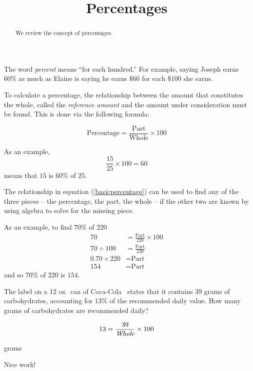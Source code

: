 \documentclass{ximera}
\title{Percentages}
\begin{document}
\begin{abstract}
We review the concept of percentages.
\end{abstract}
\maketitle


The word \emph{percent} means ``for each hundred.'' For example, saying Joseph earns $60\%$ as much as Elaine is saying he earns $\$60$ for each $\$100$ she earns.

To calculate a percentage, the relationship between the amount that constitutes the whole, called the \emph{reference amount} and the amount under consideration must be found. This is done via the following formula:

\begin{equation}\label{basicpercentage}
\text{Percentage}=\frac{\text{Part}}{\text{Whole}}\times 100
\end{equation}

As an example,
\begin{equation*}
\frac{15}{25}\times 100=60
\end{equation*}
means that $15$ is $60\%$ of $25$.

The relationship in equation (\ref{basicpercentage}) can be used to find any of the three pieces -- the percentage, the part, the whole -- if the other two are known by using algebra to solve for the missing piece.

As an example, to find $70\%$ of $220$
\begin{align*}
70&=\frac{\text{Part}}{220}\times 100\\
70\div 100 &=\frac{\text{Part}}{220}\\
0.70\times 220 &=\text{Part}\\
154&=\text{Part}
\end{align*}
and so $70\%$ of $220$ is $154$.

\newcommand\customfont[1]{{ #1 }}

\begin{question}
The label on a 12 oz.\ can of \customfont{Coca-Cola}\ states that it contains 39 grams of carbohydrates, accounting for $13\%$ of the recommended daily value. How many grams of carbohydrates are recommended daily?

\begin{solution}
\begin{hint}
\begin{equation*}13=\frac{39}{\emph{\text{Whole}}}\times 100\end{equation*}
\end{hint}
 grams

\begin{comment}
\begin{expression-answer}
function validator(p) {
    if (p == 300)
      return 1;
    if (p <> 300)
      return 0;
  }
\end{expression-answer}
\end{comment}
\end{solution}

Nice work!
\end{question}
\end{document}
